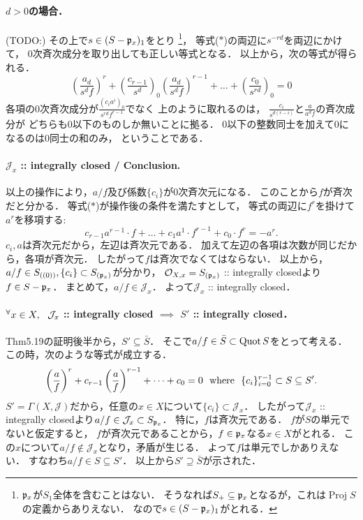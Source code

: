 \documentclass[a4paper]{jsarticle}
\newcommand{\shJ}{\mathcal{J}}
\newcommand{\shO}{\mathcal{O}}
\newcommand{\Proj}{\operatorname{Proj}}
\begin{document}
    \paragraph{$d>0$の場合．}
    (TODO:)
    その上で$s \in (S-\mathfrak{p}_x)_1$をとり
    \footnote
    {
        $\mathfrak{p}_x$が$S_1$全体を含むことはない．
        そうなれば$S_+ \subseteq \mathfrak{p}_x$となるが，これは$\Proj S$の定義からありえない．
        なので$s \in (S-\mathfrak{p}_x)_1$がとれる．
    }，
    等式($*$)の両辺に$s^{-rd}$を両辺にかけて，
    $0$次斉次成分を取り出しても正しい等式となる．
    以上から，次の等式が得られる．
    \[
        \left(\frac{a_d}{s^df}\right)^r+
        \left(\frac{c_{r-1}}{s^d}\right)_0\left(\frac{a_d}{s^df}\right)^{r-1}+
        \dots+
        \left(\frac{c_0}{s^{rd}}\right)_0
        =0
    \]
    各項の$0$次斉次成分が$\frac{(c_i a^i)_0}{s^{rd}f^{r-1}}$でなく
    上のように取れるのは，
    $\frac{c_i}{s^{d(r-i)}}$と$\frac{a}{a^df}$の斉次成分が
    どちらも$0$以下のものしか無いことに拠る．
    $0$以下の整数同士を加えて$0$になるのは$0$同士の和のみ，
    ということである．
    
    \paragraph{$\shJ_x$ :: integrally closed / Conclusion.}
    以上の操作により，$a/f$及び係数$\{c_i\}$が$0$次斉次元になる．
    このことから$f$が斉次だと分かる．
    等式($*$)が操作後の条件を満たすとして，
    等式の両辺に$f^r$を掛けて$a^r$を移項する:
    \[ c_{r-1}a^{r-1} \cdot f+\dots+c_1a^1 \cdot f^{r-1}+c_0 \cdot f^r=-a^r. \]
    $c_i, a$は斉次元だから，左辺は斉次元である．
    加えて左辺の各項は次数が同じだから，各項が斉次元．
    したがって$f$は斉次でなくてはならない．
    以上から，$a/f \in S_{((0))}, \{c_i\} \subset S_{(\mathfrak{p}_x)}$が分かり，
    $\shO_{X,x}=S_{(\I{p}_x)}$ :: integrally closedより$f \in S-\mathfrak{p}_x$．
    まとめて，$a/f \in \shJ_x$．
    よって$\shJ_x$ :: integrally closed．

    \paragraph{$\Forall{x \in X} \shJ_x$ :: integrally closed $\implies$ $S'$ :: integrally closed．}
    Thm5.19の証明後半から，$S' \subseteq \bar{S}$．
    そこで$a/f \in \bar{S} \subset \operatorname{Quot} S$をとって考える．
    この時，次のような等式が成立する．
    \[
        \left(\frac{a}{f}\right)^r+c_{r-1}\left(\frac{a}{f}\right)^{r-1}+\dots+c_0=0
        ~~\text{where}~~
        \{ c_i \}_{i=0}^{r-1} \subset S \subseteq S'.
    \]
    $S'=\Gamma(X,\shJ)$だから，任意の$x \in X$について$\{c_i\} \subset \shJ_x$．
    したがって$\shJ_x$ :: integrally closedより$a/f \in \shJ_x \subset S_{\I{p}_x}$．
    特に，$f$は斉次元である．
    $f$が$S$の単元でないと仮定すると，
    $f$が斉次元であることから，$f \in \mathfrak{p}_x$なる$x \in X$がとれる．
    この$x$について$a/f \not \in \shJ_x$となり，矛盾が生じる．
    よって$f$は単元でしかありえない．
    すなわち$a/f \in S \subseteq S'$．
    以上から$S' \supseteq \bar{S}$が示された．
\end{document}
